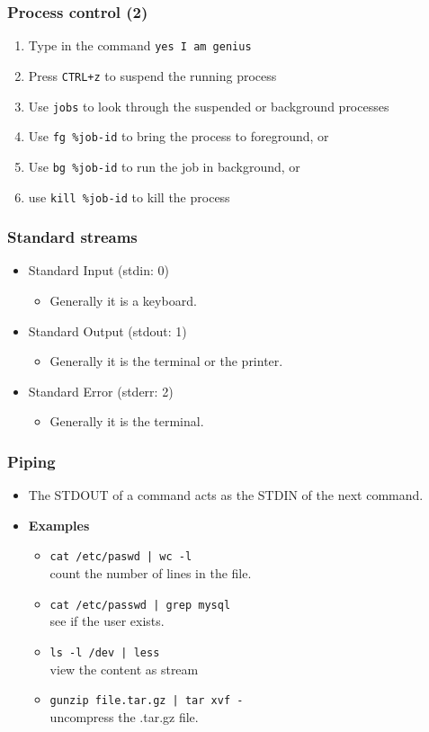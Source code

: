 \documentclass[red]{beamer}
\begin{document}
\begin{CJK*}{UTF8}{gbsn}
\begin{frame}[containsverbatim]
\frametitle{Process control (2)}
\begin{enumerate}
	\item Type in the command \lstinline{yes I am genius}
	\item Press \texttt{CTRL+z} to suspend the running process
	\item Use \lstinline{jobs} to look through the suspended or background
		processes
	\item Use \lstinline{fg %job-id} to bring the process to foreground, or
	\item Use \lstinline{bg %job-id} to run the job in background, or
	\item use \lstinline{kill %job-id} to kill the process
\end{enumerate}
\end{frame}


\begin{frame}[containsverbatim]
\frametitle{Standard streams}
\begin{itemize}
	\item Standard Input (stdin: 0)
	\begin{itemize}
		\item Generally it is a keyboard.
	\end{itemize}
	\item Standard Output (stdout: 1)
	\begin{itemize}
		\item Generally it is the terminal or the printer. 
	\end{itemize}
	\item Standard Error (stderr: 2)
	\begin{itemize}
		\item Generally it is the terminal.
	\end{itemize}
\end{itemize}
\end{frame}


\begin{frame}[containsverbatim]
\frametitle{Piping}
\begin{itemize}
	\item The STDOUT of a command acts as the STDIN of the next command.
	\item \textbf{Examples}
	\begin{itemize}
		\item \lstinline{cat /etc/paswd | wc -l}\\count the number of lines in the file.
		\item \lstinline{cat /etc/passwd | grep mysql}\\see if the user exists.
		\item \lstinline{ls -l /dev | less}\\view the content as stream
		\item \lstinline{gunzip file.tar.gz | tar xvf -}\\uncompress the .tar.gz file.
	\end{itemize}
\end{itemize}
\end{frame}



\end{CJK*}
\end{document}
